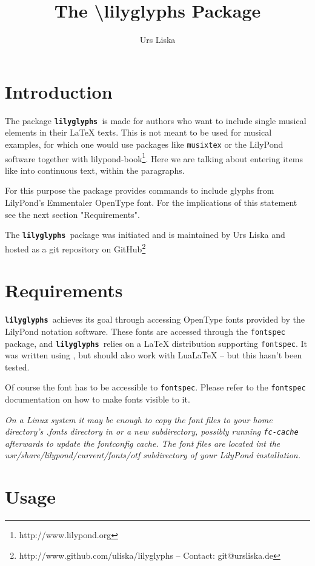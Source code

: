 \documentclass{article}
\title{The \textbackslash lilyglyphs Package}
\author{Urs Liska}
\newcommand{\lilyglyphs}{\texttt{\textbf{lilyglyphs }}}
\begin{document}
\maketitle
\tableofcontents
\section{Introduction}
The package \lilyglyphs is made for authors who want to include single musical elements in their \LaTeX{} texts. This is not meant to be used for musical examples, for which one would use packages like \texttt{musixtex} or the LilyPond software together with lilypond-book\footnote{http://www.lilypond.org}. Here we are talking about entering items like \lilyRFZ* into continuous text, within the paragraphs.

For this purpose the package provides commands to include glyphs from LilyPond's Emmentaler OpenType font. For the implications of this statement see the next section "Requirements".

The \lilyglyphs package was initiated and is maintained by Urs Liska and hosted as a git repository on GitHub\footnote{http://www.github.com/uliska/lilyglyphs -- Contact: git@ursliska.de}

\section{Requirements}
\lilyglyphs achieves its goal through accessing OpenType fonts provided by the LilyPond notation software. These fonts are accessed through the \texttt{fontspec} package, and \lilyglyphs relies on a \LaTeX{} distribution supporting \texttt{fontspec}. It was written using \XeLaTeX, but should also work with LuaLaTeX -- but this hasn't been tested.

Of course the font has to be accessible to \texttt{fontspec}. Please refer to the \texttt{fontspec} documentation on how to make fonts visible to it. 

\textit{On a Linux system it may be enough to copy the font files to your home directory's .fonts directory in or a new subdirectory, possibly running \texttt{fc-cache} afterwards to update the fontconfig cache. The font files are located int the usr/share/lilypond/current/fonts/otf subdirectory of your LilyPond installation.}



\section{Usage}
\end{document}
